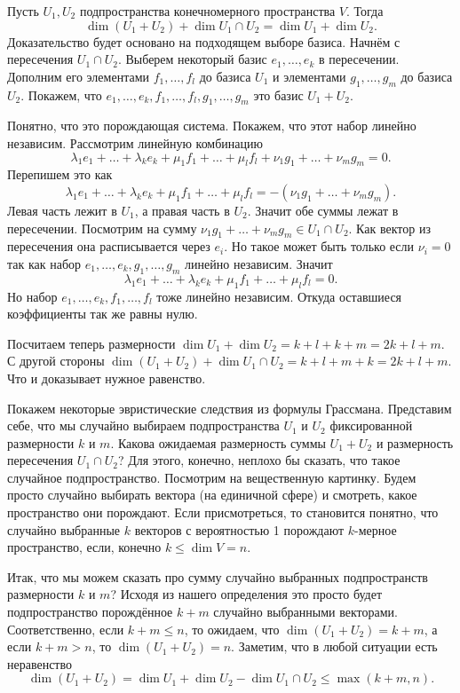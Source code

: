  Пусть $U_1,U_2$ подпространства конечномерного пространства  $V$. Тогда 
$$\dim (U_1+U_2) + \dim U_1\cap U_2 = \dim U_1 + \dim U_2.$$
\ethrm
\proof Доказательство будет основано на подходящем выборе базиса. Начнём с пересечения $U_1\cap U_2$. Выберем некоторый базис $e_1,\dots,e_k$ в пересечении. Дополним его элементами $f_1,\dots,f_l$ до базиса $U_1$ и элементами $g_1,\dots,g_m$ до базиса $U_2$. Покажем, что $e_1,\dots,e_k, f_1,\dots,f_l, g_1,\dots,g_m $ это базис $U_1+U_2$. 


Понятно, что это порождающая система. Покажем, что этот набор линейно независим. Рассмотрим линейную комбинацию
$$\lambda_1e_1+\dots+\lambda_ke_k +\mu_1 f_1+\dots+\mu_lf_l+ \nu_1g_1+\dots+\nu_m g_m=0.$$
Перепишем это как 
$$\lambda_1e_1+\dots+\lambda_ke_k +\mu_1 f_1+\dots+\mu_lf_l=-(\nu_1g_1+\dots+\nu_m g_m).$$
Левая часть лежит в $U_1$, а правая часть в $U_2$. Значит обе суммы лежат в пересечении. Посмотрим на сумму $\nu_1g_1+\dots+\nu_m g_m\in U_1\cap U_2$. Как вектор из пересечения она расписывается через $e_i$. Но такое может быть только если $\nu_i=0$ так как набор $e_1,\dots,e_k,g_1,\dots,g_m$ линейно независим.  Значит
$$\lambda_1e_1+\dots+\lambda_ke_k +\mu_1 f_1+\dots+\mu_lf_l=0.$$
Но набор $e_1,\dots,e_k,f_1,\dots,f_l$ тоже линейно независим. Откуда оставшиеся коэффициенты так же равны нулю.

Посчитаем теперь размерности $\dim U_1+\dim U_2= k+l+k+m=2k+l+m$. С другой стороны $\dim (U_1+U_2) + \dim U_1\cap U_2= k+l+m+k=2k+l+m$. Что и доказывает нужное равенство.
\endproof

Покажем некоторые эвристические следствия из формулы Грассмана. Представим себе, что мы случайно выбираем подпространства $U_1$ и $U_2$ фиксированной размерности $k$ и $m$. Какова ожидаемая размерность суммы $U_1+U_2$ и размерность пересечения $U_1\cap U_2$?  Для этого, конечно, неплохо бы сказать, что такое случайное подпространство. Посмотрим на вещественную картинку.  Будем просто случайно выбирать вектора (на единичной сфере) и смотреть, какое пространство они порождают. Если присмотреться, то становится понятно, что случайно выбранные $k$ векторов с вероятностью 1 порождают $k$-мерное пространство, если, конечно $k\leq \dim V=n$. 

Итак, что мы можем сказать про сумму случайно выбранных подпространств размерности $k$ и $m$? Исходя из нашего определения это просто будет подпространство порождённое $k+m$ случайно выбранными векторами. Соответственно, если $k+m\leq n$, то ожидаем, что $\dim (U_1+U_2)=k+m$, а если $k+m > n$, то $\dim (U_1+U_2)=n$. Заметим, что в любой ситуации есть неравенство
$$\dim (U_1+U_2)=\dim U_1+\dim U_2 - \dim U_1\cap U_2 \leq \max(k+m,n).$$

